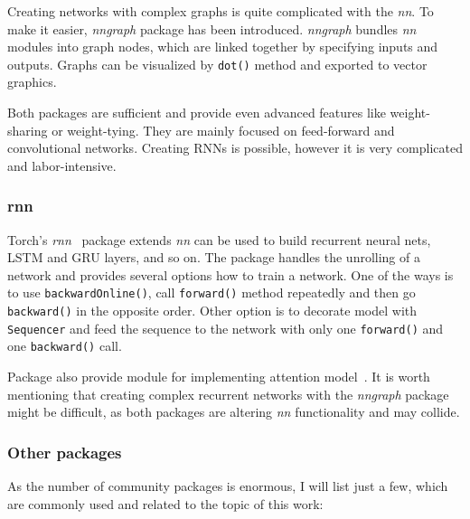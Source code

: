 Creating networks with complex graphs is quite complicated with the \emph{nn}. To make it easier, \emph{nngraph} package has been introduced. \emph{nngraph} bundles \emph{nn} modules into graph nodes, which are linked together by specifying inputs and outputs. Graphs can be visualized by \texttt{dot()} method and exported to vector graphics.

Both packages are sufficient and provide even advanced features like weight-sharing or weight-tying. They are mainly focused on feed-forward and convolutional networks. Creating RNNs is possible, however it is very complicated and labor-intensive.

\subsubsection{rnn}\label{subsec:torch-rnn}

Torch's \emph{rnn}~\cite{DBLP:journals/corr/LeonardWW15} package extends \emph{nn} can be used to build recurrent neural nets, LSTM and GRU layers, and so on. The package handles the unrolling of a network and provides several options how to train a network. One of the ways is to use \texttt{backwardOnline()}, call \texttt{forward()} method repeatedly and then go \texttt{backward()} in the opposite order. Other option is to decorate model with \texttt{Sequencer} and feed the sequence to the network with only one \texttt{forward()} and one \texttt{backward()} call.

Package also provide module for implementing attention model~\cite{DBLP:journals/corr/MnihHGK14}. It is worth mentioning that creating complex recurrent networks with the \emph{nngraph} package might be difficult, as both packages are altering \emph{nn} functionality and may collide.

\subsubsection{Other packages}

As the number of community packages is enormous, I will list just a few, which are commonly used and related to the topic of this work:

